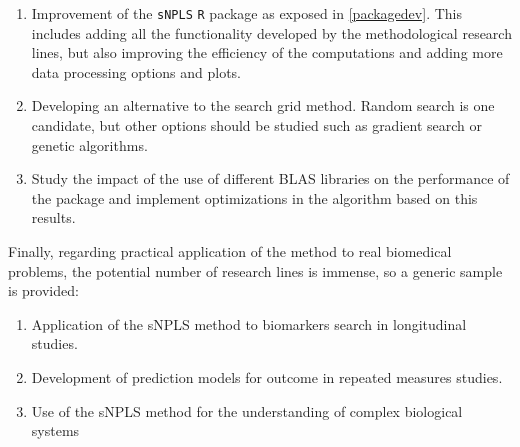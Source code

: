 \begin{enumerate}
    \item Improvement of the \texttt{sNPLS} \texttt{R} package as exposed in \autoref{packagedev}. This includes adding all the functionality developed by the methodological research lines, but also improving the efficiency of the computations and adding more data processing options and plots.
    \item Developing an alternative to the search grid method. Random search is one candidate, but other options should be studied such as gradient search or genetic algorithms.
    \item Study the impact of the use of different BLAS libraries on the performance of the package and implement optimizations in the algorithm based on this results.
\end{enumerate}
\vspace{10pt}
Finally, regarding practical application of the method to real biomedical problems, the potential number of research lines is immense, so a generic sample is provided:

\begin{enumerate}
    \item Application of the sNPLS method to biomarkers search in longitudinal studies.
    \item Development of prediction models for outcome in repeated measures studies.
    \item Use of the sNPLS method for the understanding of complex biological systems
\end{enumerate}
